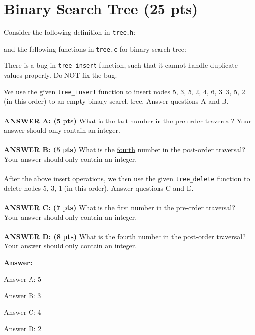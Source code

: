 \newpage
\section{Binary Search Tree (25 pts)}

Consider the following definition in \texttt{tree.h}:

\resetlinenumber[1]
\linenumbers
\begin{tt}
	
\end{tt}
\nolinenumbers

and the following functions in {\tt tree.c} for binary search tree:

\resetlinenumber[1]
\linenumbers
\begin{tt}
	
\end{tt}
\nolinenumbers

There is a bug in {\tt tree\_insert} function, such that it cannot handle duplicate values properly. Do NOT fix the bug.

We use the given {\tt tree\_insert} function to insert nodes 5, 3, 5, 2, 4, 6, 3, 3, 5, 2 (in this order) to an empty binary search tree. Answer questions A and B.
\\
~\\
{\bf ANSWER A: (5 pts)} What is the \underline{last} number in the pre-order traversal? Your answer should only contain an integer.
\\
~\\
{\bf ANSWER B: (5 pts)} What is the \underline{fourth} number in the post-order traversal? Your answer should only contain an integer.
\\
~\\
After the above insert operations, we then use the given {\tt tree\_delete} function to delete nodes 5, 3, 1 (in this order). Answer questions C and D.
\\
~\\
{\bf ANSWER C: (7 pts)} What is the \underline{first} number in the pre-order traversal? Your answer should only contain an integer.
\\
~\\
{\bf ANSWER D: (8 pts)} What is the \underline{fourth} number in the post-order traversal? Your answer should only contain an integer.

\ifexam


\else


{\bf Answer:}

Answer A: 5

Answer B: 3

Answer C: 4

Answer D: 2


\fi

